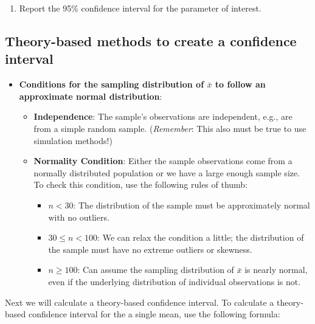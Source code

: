 \documentclass[
]{report}
\providecommand{\tightlist}{%
  \setlength{\itemsep}{0pt}\setlength{\parskip}{0pt}}
\begin{document}
\begin{enumerate}
\def\labelenumi{\arabic{enumi}.}
\setcounter{enumi}{2}
\tightlist
\item
  Report the 95\% confidence interval for the parameter of interest.
\end{enumerate}

\vspace{0.2in}

\subsection*{Theory-based methods to create a confidence interval}\label{theory-based-methods-to-create-a-confidence-interval}

\begin{itemize}
\item
  \textbf{Conditions for the sampling distribution of \(\bar{x}\) to follow an approximate normal distribution}:

  \begin{itemize}
  \item
    \textbf{Independence}: The sample's observations are independent, e.g., are from a simple random sample. (\emph{Remember}: This also must be true to use simulation methods!)
  \item
    \textbf{Normality Condition}: Either the sample observations come from a normally distributed population or we have a large enough sample size. To check this condition, use the following rules of thumb:

    \begin{itemize}
    \item
      \(n < 30\): The distribution of the sample must be approximately normal with no outliers.
    \item
      \(30 \le n < 100\): We can relax the condition a little; the distribution of the sample must have no extreme outliers or skewness.
    \item
      \(n \ge 100\): Can assume the sampling distribution of \(\bar{x}\) is nearly normal, even if the underlying distribution of individual observations is not.
    \end{itemize}
  \end{itemize}
\end{itemize}

Next we will calculate a theory-based confidence interval. To calculate a theory-based confidence interval for the a single mean, use the following formula:
\end{document}
